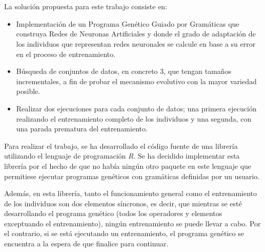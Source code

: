 \documentclass[spanish,a4paper,12pt,twoside]{report}
\begin{document}
  \chapter{\vspace{-3cm}{\LARGE 6. Solución propuesta}}
  \setcounter{figure}{15}
  \vspace{-1cm}
  La solución propuesta para este trabajo consiste en: \par
  \begin{itemize}
    \item Implementación de un Programa Genético Guiado por Gramáticas que construya Redes de Neuronas Artificiales y donde el grado de adaptación de los individuos que representan redes neuronales se calcule en base a su error en el proceso de entrenamiento.
    \item Búsqueda de conjuntos de datos, en concreto 3, que tengan tamaños incrementales, a fin de probar el mecanismo evolutivo con la mayor variedad posible.
    \item Realizar dos ejecuciones para cada conjunto de datos; una primera ejecución realizando el entrenamiento completo de los individuos y una segunda, con una parada prematura del entrenamiento.
  \end{itemize} \par
  Para realizar el trabajo, se ha desarrollado el código fuente de una librería utilizando el lenguaje de programación \emph{R}. Se ha decidido implementar esta librería por el hecho de que no había ningún otro paquete en este lenguaje que permitiese ejecutar programas genéticos con gramáticas definidas por un usuario. \par
  Además, en esta librería, tanto el funcionamiento general como el entrenamiento de los individuos son dos elementos síncronos, es decir, que mientras se esté desarrollando el programa genético (todos los operadores y elementos exceptuando el entrenamiento), ningún entrenamiento se puede llevar a cabo. Por el contrario, si se está ejecutando un entrenamiento, el programa genético se encuentra a la espera de que finalice para continuar. \par
\end{document}
